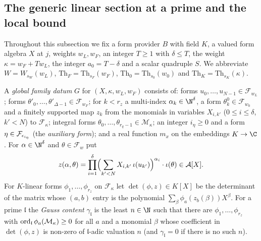 \subsection{The generic linear section at a prime and the local bound}\label{sec:pf:onto1:local}

Throughout this subsection we fix a form provider $B$ with field $K$, a valued form algebra $X$ at $j$, weights
$w_L,w_F$, an integer $T\ge1$ with $\delta\le T$, the weight $\kappa=w_F+Tw_L$, the integer $a_0=T-\delta$ and a
scalar quadruple $S$. We abbreviate $W=W_{s_W}(w_L)$, $\mathrm{Th}_F=\mathrm{Th}_{s_F}(w_F)$,
$\mathrm{Th}_0=\mathrm{Th}_{s_0}(w_0)$ and $\mathrm{Th}_K=\mathrm{Th}_{s_K}(\kappa)$.

\begin{definition}\label{pf:onto1:gfd}
A \emph{global family datum} $G$ for $(X,\kappa,w_L,w_F)$ consists of: forms $u_0,\dots,u_{N-1}\in\mathcal F_{w_L}$;
forms $\theta'_0,\dots,\theta'_{\Delta-1}\in\mathcal F_{w_F}$; for $k<r_z$ a multi-index $\alpha_k\in\N^{\delta}$, a form
$\theta^0_k\in\mathcal F_{w_0}$ and a finitely supported map $z_k$ from the monomials in variables $X_{i,k'}$
($0\le i\le\delta$, $k'<N$) to $\mathcal F_\kappa$; integral forms $\theta_0,\dots,\theta_{r_q-1}\in\mathcal M_\kappa$; an integer
$i_\eta\ge0$ and a form $\eta\in\mathcal F_{\epsilon_{i_\eta}}$ (the \emph{auxiliary form}); and a real function $m_x$
on the embeddings $K\to\C$. For $\alpha\in\N^\delta$ and $\theta\in\mathcal F_{w}$ put
\[
z(\alpha,\theta)=\prod_{i=1}^{\delta}\Bigl(\sum_{k'<N}X_{i,k'}\,\iota(u_{k'})\Bigr)^{\alpha_i}\cdot\iota(\theta)\in\mathcal A[X].
\]
For $K$-linear forms $\phi_1,\dots,\phi_{r_z}$ on $\mathcal F_\kappa$ let $\det(\phi,z)\in K[X]$ be the determinant of the
matrix whose $(a,b)$ entry is the polynomial $\sum_\beta\phi_a(z_b(\beta))X^\beta$. For a prime $\mathfrak l$ the
\emph{Gauss content} $\gamma_{\mathfrak l}$ is the least $n\in\N$ such that there are $\phi_1,\dots,\phi_{r_z}$ with
$\operatorname{ord}_{\mathfrak l}\phi_a(\mathcal M_\kappa)\ge0$ for all $a$ and a monomial $\beta$ whose coefficient in $\det(\phi,z)$ is
non-zero of $\mathfrak l$-adic valuation $n$ (and $\gamma_{\mathfrak l}=0$ if there is no such $n$).
\end{definition}

